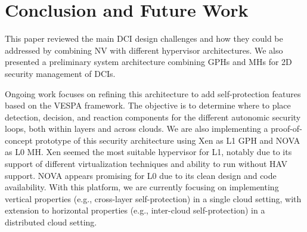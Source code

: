 \documentclass{sig-alternate}
\begin{document}
\section{Conclusion and Future Work}
\label{sec:conclu}

\noindent This paper reviewed the main DCI design challenges and how they could be addressed by combining NV with different hypervisor architectures. We also presented a preliminary system architecture combining GPHs and MHs for 2D security management of DCIs. 

Ongoing work focuses on refining this architecture to add self-protection features based on the VESPA framework. The objective is to determine where to place detection, decision, and reaction components for the different autonomic security loops, both within layers and across clouds. We are also implementing a proof-of-concept prototype of this security architecture using Xen as L1 GPH and NOVA as L0 MH. Xen seemed the most suitable hypervisor for L1, notably due to its support of different virtualization techniques and ability to run without HAV support. NOVA appears promising for L0 due to its clean design and code availability. With this platform, we are currently focusing on implementing vertical properties (e.g., cross-layer self-protection) in a single cloud setting, with extension to horizontal properties (e.g., inter-cloud self-protection) in a distributed cloud setting.
\end{document}

